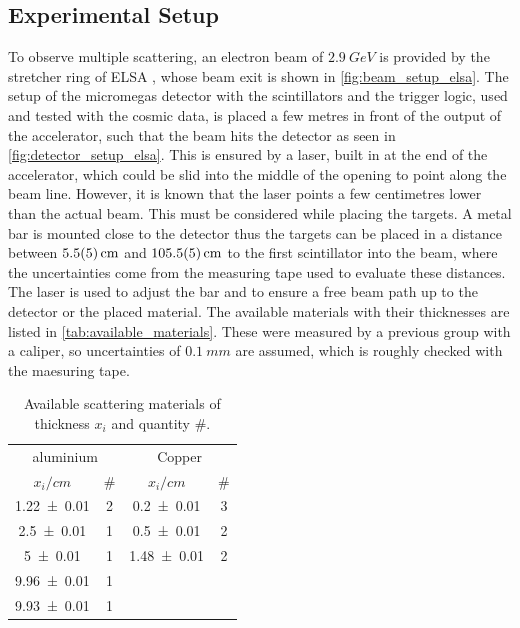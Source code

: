 \documentclass[sn-mathphys-num,iicol]{sn-jnl}
\theoremstyle{thmstyleone}
\theoremstyle{thmstyletwo}
\theoremstyle{thmstylethree}
\begin{document}
\subsection{Experimental Setup}
To observe multiple scattering, an electron beam of $\SI{2.9}{GeV}$ is provided by the stretcher ring of ELSA \cite{ELSA}, whose beam exit is shown in \autoref{fig:beam_setup_elsa}. 
The setup of the micromegas detector with the scintillators and the trigger logic, used and tested with the cosmic data, is placed a few metres in front of the output of the accelerator, such that the beam hits the detector as seen in \autoref{fig:detector_setup_elsa}. 
This is ensured by a laser, built in at the end of the accelerator, which could be slid into the middle of the opening to point along the beam line. 
However, it is known that the laser points a few centimetres lower than the actual beam. 
This must be considered while placing the targets.
A metal bar is mounted close to the detector thus the targets can be placed in a distance between $\SI{5.5\pm 0.5}{cm}$ and $\SI{105.5\pm 0.5}{cm}$ to the first scintillator into the beam, where the uncertainties come from the measuring tape used to evaluate these distances. 
The laser is used to adjust the bar and to ensure a free beam path up to the detector or the placed material.
The available materials with their thicknesses are listed in \autoref{tab:available_materials}. 
These were measured by a previous group with a caliper, so uncertainties of $\SI{0.1}{mm}$ are assumed, which is roughly checked with the maesuring tape.


\begin{table}\centering
  \renewcommand*{\arraystretch}{1.1}
  \begin{tabular}{c|c||c|c}
    \multicolumn{2}{c||}{aluminium} & \multicolumn{2}{c}{Copper} \\
    {\fontsize{8}{3}\selectfont $x_i/\si{cm}$} & {\fontsize{8}{3}\selectfont \#} & {\fontsize{8}{3}\selectfont $x_i/\si{cm}$} & {\fontsize{8}{3}\selectfont \# } \\\hline \rule{0pt}{3ex}
    \num{1.22\pm 0.01} & 2 & \num{0.2\pm 0.01} & 3 \\
    \num{2.5\pm 0.01} & 1 & \num{0.5\pm 0.01} & 2 \\
    \num{5\pm 0.01} & 1 & \num{1.48\pm 0.01} & 2 \\
    \num{9.96\pm 0.01} & 1 & & \\
    \num{9.93\pm 0.01} & 1 & & \\
  \end{tabular}\vspace{3mm}
  \caption{Available scattering materials of thickness $x_i$ and quantity $\#$.}
  \label{tab:available_materials}
\end{table}
\end{document}
